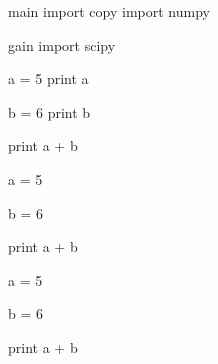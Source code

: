 \documentclass[a4paper,12pt]{book}
\begin{document}
\begin{pytexTemplate}{main}
import copy
import numpy
\end{pytexTemplate}


\begin{pytexTemplate}{gain}
import scipy
\end{pytexTemplate}



\begin{pytex}
a = 5
print a
\end{pytex}

\begin{pytex}
b = 6
print b
\end{pytex}

\begin{pytex}
print a + b
\end{pytex}


\begin{pytex}
a = 5
\end{pytex}

\begin{pytex}
b = 6
\end{pytex}

\begin{pytex}
print a + b
\end{pytex}


\begin{pytex}
a = 5
\end{pytex}

\begin{pytex}
b = 6
\end{pytex}

\begin{pytex}
print a + b
\end{pytex}
\end{document}
